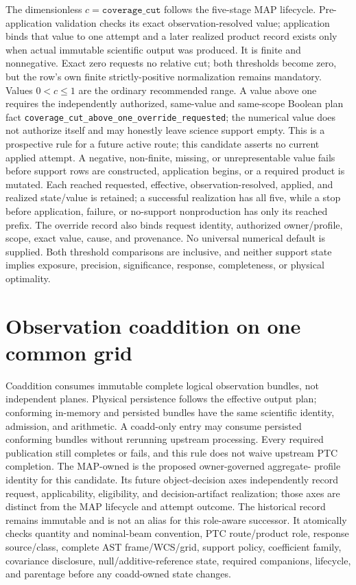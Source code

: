 \documentclass[10pt]{article}
\newcommand{\code}[1]{\nolinkurl{#1}}
\begin{document}
The dimensionless \(c=\texttt{coverage\_cut}\) follows the five-stage MAP
lifecycle. Pre-application validation checks its exact observation-resolved
value; application binds that value to one attempt and a later realized product
record exists only when actual immutable scientific output was produced. It is
finite and nonnegative.
Exact zero requests no relative cut; both thresholds become zero, but the
row's own finite strictly-positive normalization remains mandatory. Values
\(0<c\le1\) are the ordinary recommended range. A value above one requires the
independently authorized, same-value and same-scope Boolean plan fact
\code{coverage_cut_above_one_override_requested}; the numerical value does not
authorize itself and may honestly leave science support empty.
\SCIMapEmptySupportDisposition{} This is a prospective rule for a future active
route; this candidate asserts no current applied attempt. A negative,
non-finite, missing, or unrepresentable value fails before support
rows are constructed, application begins, or a required product is mutated.
Each reached requested, effective, observation-resolved, applied, and realized
state/value is retained; a successful realization has all five, while a stop
before application, failure, or no-support nonproduction has only its reached
prefix. The override record also
binds request identity, authorized owner/profile, scope, exact value, cause,
and provenance. No
universal numerical default is supplied. Both threshold comparisons are
inclusive, and neither support state implies exposure, precision,
significance, response, completeness, or physical optimality.

\clearpage
\section{Observation coaddition on one common grid}

Coaddition consumes immutable complete logical observation bundles, not
independent planes. Physical persistence follows the effective output plan;
conforming in-memory and persisted bundles have the same scientific identity,
admission, and arithmetic. A coadd-only entry may consume persisted conforming
bundles without rerunning upstream processing. Every required publication
still completes or fails, and this rule does not waive upstream PTC completion.
The MAP-owned \SCIMapCoaddProfile{} is the proposed owner-governed aggregate-
profile identity for this candidate. \SCIMapCandidateProfileStatusDefinition{}
Its future object-decision axes independently record request, applicability,
eligibility, and decision-artifact realization; those axes are distinct from
the MAP lifecycle and attempt outcome.
The historical \SCIMapCoaddProfileHistorical{} record remains immutable and
is not an alias for this role-aware successor. It atomically checks quantity
and nominal-beam convention, PTC route/product role, response source/class,
complete AST frame/WCS/grid, support policy, coefficient family, covariance
disclosure, null/additive-reference state, required companions, lifecycle,
and parentage before any coadd-owned state changes.
\end{document}
